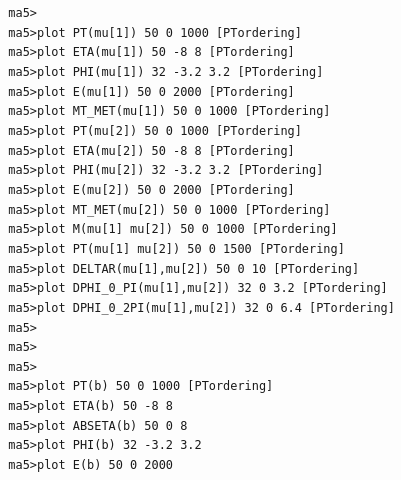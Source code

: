 \documentclass[a4paper, 10pt]{article}
\begin{document}
\texttt{ }\texttt{ }\texttt{ma5>\\
}
\texttt{ }\texttt{ }\texttt{ma5>plot PT(mu[1])      50 0 1000 [PTordering]\\
}
\texttt{ }\texttt{ }\texttt{ma5>plot ETA(mu[1])     50 -8 8 [PTordering]\\
}
\texttt{ }\texttt{ }\texttt{ma5>plot PHI(mu[1])     32 -3.2 3.2 [PTordering]\\
}
\texttt{ }\texttt{ }\texttt{ma5>plot E(mu[1])       50 0 2000 [PTordering]\\
}
\texttt{ }\texttt{ }\texttt{ma5>plot MT\_MET(mu[1])  50 0 1000 [PTordering]\\
}
\texttt{ }\texttt{ }\texttt{ma5>plot PT(mu[2])      50 0 1000 [PTordering]\\
}
\texttt{ }\texttt{ }\texttt{ma5>plot ETA(mu[2])     50 -8 8 [PTordering]\\
}
\texttt{ }\texttt{ }\texttt{ma5>plot PHI(mu[2])     32 -3.2 3.2 [PTordering]\\
}
\texttt{ }\texttt{ }\texttt{ma5>plot E(mu[2])       50 0 2000 [PTordering]\\
}
\texttt{ }\texttt{ }\texttt{ma5>plot MT\_MET(mu[2])  50 0 1000 [PTordering]\\
}
\texttt{ }\texttt{ }\texttt{ma5>plot M(mu[1] mu[2])  50 0 1000 [PTordering]\\
}
\texttt{ }\texttt{ }\texttt{ma5>plot PT(mu[1] mu[2]) 50 0 1500 [PTordering]\\
}
\texttt{ }\texttt{ }\texttt{ma5>plot DELTAR(mu[1],mu[2])      50 0 10 [PTordering]\\
}
\texttt{ }\texttt{ }\texttt{ma5>plot DPHI\_0\_PI(mu[1],mu[2])   32 0 3.2 [PTordering]\\
}
\texttt{ }\texttt{ }\texttt{ma5>plot DPHI\_0\_2PI(mu[1],mu[2])  32 0 6.4 [PTordering]\\
}
\texttt{ }\texttt{ }\texttt{ma5>\\
}
\texttt{ }\texttt{ }\texttt{ma5>\\
}
\texttt{ }\texttt{ }\texttt{ma5>\\
}
\texttt{ }\texttt{ }\texttt{ma5>plot PT(b)       50 0 1000 [PTordering]\\
}
\texttt{ }\texttt{ }\texttt{ma5>plot ETA(b)      50 -8 8\\
}
\texttt{ }\texttt{ }\texttt{ma5>plot ABSETA(b)   50 0 8\\
}
\texttt{ }\texttt{ }\texttt{ma5>plot PHI(b)      32 -3.2 3.2\\
}
\texttt{ }\texttt{ }\texttt{ma5>plot E(b)        50 0 2000\\
}
\end{document}
